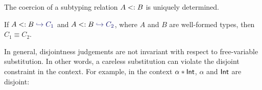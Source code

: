 The coercion of a subtyping relation $A <: B$ is uniquely determined.

\begin{lemma} \label{unique-coercion}

  If $A \subtype B \yields {C_1}$ and $A \subtype B \yields {C_2}$, where $A$
  and $B$ are well-formed types, then $C_1 \equiv C_2$.

\end{lemma}

%
%

In general, disjointness judgements are not invariant with respect to
free-variable substitution. In other words, a careless substitution can violate
the disjoint constraint in the context. For example, in the context $\alpha
* \textsf{Int}$, $\alpha$ and $\textsf{Int}$ are disjoint:

